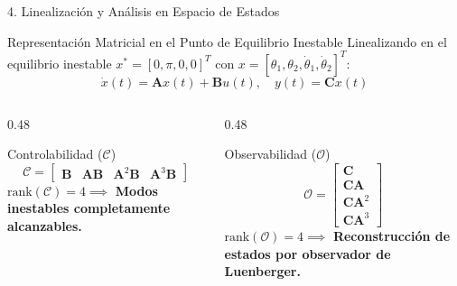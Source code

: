 \documentclass[10pt,aspectratio=169]{beamer}
\begin{document}
\begin{frame}{4. Linealización y Análisis en Espacio de Estados}
  \begin{block}{Representación Matricial en el Punto de Equilibrio Inestable}
    Linealizando en el equilibrio inestable $x^* = [0, \pi, 0, 0]^T$ con $x = [\theta_1, \theta_2, \dot{\theta}_1, \dot{\theta}_2]^T$:
    \begin{equation*}
      \dot{x}(t) = \mathbf{A} x(t) + \mathbf{B} u(t), \quad y(t) = \mathbf{C} x(t)
    \end{equation*}
  \end{block}

  \begin{columns}[T]
    \begin{column}{0.48\textwidth}
      \begin{exampleblock}{Controlabilidad ($\mathcal{C}$)}
        \begin{equation*}
          \mathcal{C} = \begin{bmatrix} \mathbf{B} & \mathbf{A}\mathbf{B} & \mathbf{A}^2\mathbf{B} & \mathbf{A}^3\mathbf{B} \end{bmatrix}
        \end{equation*}
        $\text{rank}(\mathcal{C}) = 4 \implies$ \textbf{Modos inestables completamente alcanzables.}
      \end{exampleblock}
    \end{column}
    \begin{column}{0.48\textwidth}
      \begin{exampleblock}{Observabilidad ($\mathcal{O}$)}
        \begin{equation*}
          \mathcal{O} = \begin{bmatrix} \mathbf{C} \\ \mathbf{C}\mathbf{A} \\ \mathbf{C}\mathbf{A}^2 \\ \mathbf{C}\mathbf{A}^3 \end{bmatrix}
        \end{equation*}
        $\text{rank}(\mathcal{O}) = 4 \implies$ \textbf{Reconstrucción de estados por observador de Luenberger.}
      \end{exampleblock}
    \end{column}
  \end{columns}
\end{frame}
\end{document}
